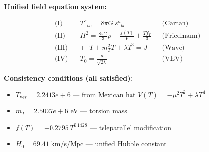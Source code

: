
\textbf{Unified field equation system:}

\begin{align}
  \text{(I)} \quad & T^a{}_{bc} = 8\pi G \, s^a{}_{bc} && \text{(Cartan)} \\
  \text{(II)} \quad & H^2 = \frac{8\pi G}{3}\rho - \frac{f(T)}{6} + \frac{Tf_T}{3} && \text{(Friedmann)} \\
  \text{(III)} \quad & \Box T + m_T^2 T + \lambda T^3 = J && \text{(Wave)} \\
  \text{(IV)} \quad & T_0 = \frac{\mu}{\sqrt{2\lambda}} && \text{(VEV)}
\end{align}

\textbf{Consistency conditions (all satisfied):}
\begin{itemize}
  \item $T_{\text{vev}} = 2.2413e+6$ — from Mexican hat $V(T) = -\mu^2 T^2 + \lambda T^4$
  \item $m_T = 2.5027e+6$ eV — torsion mass
  \item $f(T) = -0.2795 \, T^{0.1428}$ — teleparallel modification
  \item $H_0 = 69.41$ km/s/Mpc — unified Hubble constant
\end{itemize}